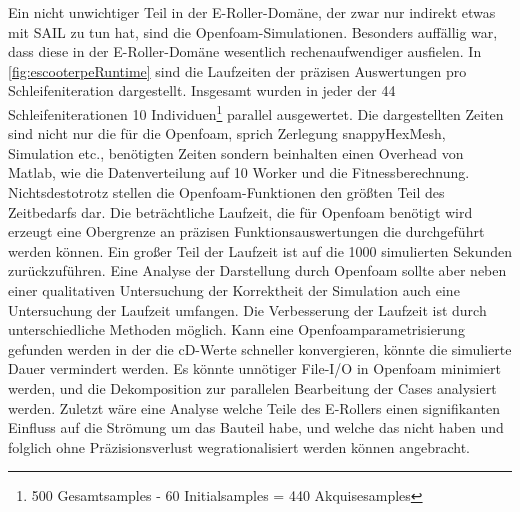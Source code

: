 Ein nicht unwichtiger Teil in der E-Roller-Domäne, der zwar nur indirekt etwas mit SAIL zu tun hat, sind die Openfoam-Simulationen.
Besonders auffällig war, dass diese in der E-Roller-Domäne wesentlich rechenaufwendiger ausfielen.
In \cref{fig:escooterpeRuntime} sind die Laufzeiten der präzisen Auswertungen pro Schleifeniteration dargestellt.
Insgesamt wurden in jeder der 44 Schleifeniterationen 10 Individuen\footnote{500 Gesamtsamples - 60 Initialsamples = 440 Akquisesamples} parallel ausgewertet.
Die dargestellten Zeiten sind nicht nur die für die Openfoam, sprich Zerlegung snappyHexMesh, Simulation etc., benötigten Zeiten sondern beinhalten einen Overhead von Matlab, wie die Datenverteilung auf 10 Worker und die Fitnessberechnung.
Nichtsdestotrotz stellen die Openfoam-Funktionen den größten Teil des Zeitbedarfs dar.
Die beträchtliche Laufzeit, die für Openfoam benötigt wird erzeugt eine Obergrenze an präzisen Funktionsauswertungen die durchgeführt werden können.
Ein großer Teil der Laufzeit ist auf die 1000 simulierten Sekunden zurückzuführen.
Eine Analyse der Darstellung durch Openfoam sollte aber neben einer qualitativen Untersuchung der Korrektheit der Simulation auch eine Untersuchung der Laufzeit umfangen.
Die Verbesserung der Laufzeit ist durch unterschiedliche Methoden möglich.
Kann eine Openfoamparametrisierung gefunden werden in der die cD-Werte schneller konvergieren, könnte die simulierte Dauer vermindert werden.
Es könnte unnötiger File-I/O in Openfoam minimiert werden, und die Dekomposition zur parallelen Bearbeitung der Cases analysiert werden.
Zuletzt wäre eine Analyse welche Teile des E-Rollers einen signifikanten Einfluss auf die Strömung um das Bauteil habe, und welche das nicht haben und folglich ohne Präzisionsverlust wegrationalisiert werden können angebracht.


